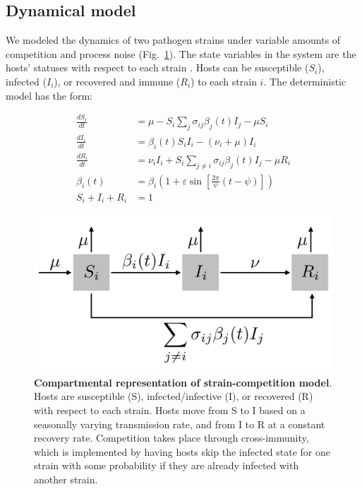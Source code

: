 \subsection*{Dynamical model}
We modeled the dynamics of two pathogen strains under variable amounts of competition and process noise (Fig.~\ref{fig:compartmental}).
The state variables in the system are the hosts' statuses with respect to each strain \cite{Gog2002}. 
Hosts can be susceptible ($S_i$), infected ($I_i$), or recovered and immune ($R_i$) to each strain $i$. 
The deterministic model has the form:

\begin{align}
\frac{dS_i}{dt} &=
    \mu
    - S_i\sum\limits_{j}
    \sigma_{ij}
    \beta_j(t) 
    I_j
    - \mu S_i \\
\frac{dI_i}{dt} &= 
    \beta_i(t) S_i I_i
    - (\nu_i + \mu) I_i \\
\frac{dR_i}{dt} &=
    \nu_i I_i
    + S_i\sum\limits_{j \neq i} \sigma_{ij} \beta_j(t)  I_j
    - \mu R_i \\
\beta_i(t) &= \beta_i
    \left(
        1 + \varepsilon \sin \left[
            \frac{2\pi}{\psi} \left( t - \psi \right)
        \right]
    \right) \\
S_i + I_i + R_i &= 1
\end{align}

\begin{figure}
    \begin{center}
        \includegraphics[width=5in]{dataflow/out/fig_compartmental/fig_compartmental.pdf}
    \end{center}
    \caption{\textbf{Compartmental representation of strain-competition model}.
    Hosts are susceptible (S), infected/infective (I), or recovered (R) with respect to each strain.
    Hosts move from S to I based on a seasonally varying transmission rate, and from I to R at a constant recovery rate. Competition takes place through cross-immunity, which is implemented by having hosts skip the infected state for one strain with some probability if they are already infected with another strain.
    \label{fig:compartmental}}
\end{figure}


